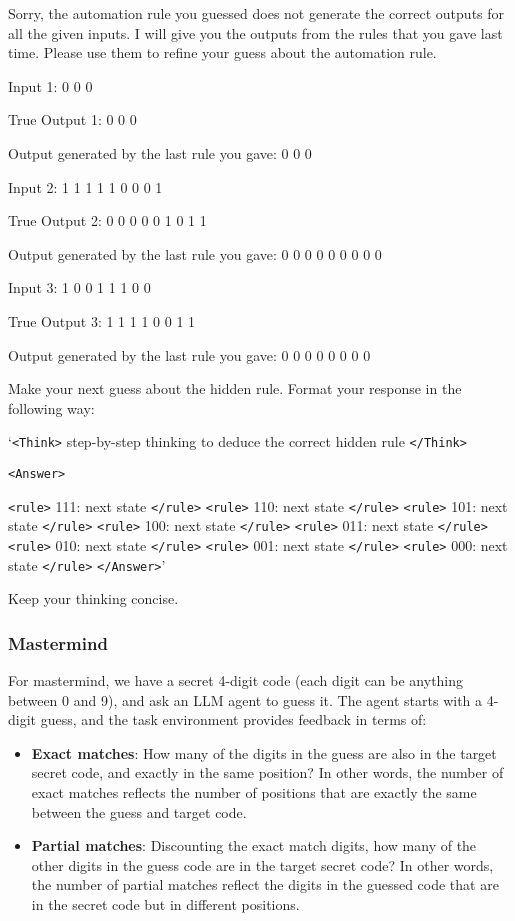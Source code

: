 \begin{tcolorbox}[colback=gray!20, colframe=black, title=Cellular Automata Environment Feedback]
Sorry, the automation rule you guessed does not generate the correct outputs for all the given inputs. I will give you the outputs from the rules that you gave last time. Please use them to refine your guess about the automation rule.

Input 1: 0 0 0

True Output 1: 0 0 0

Output generated by the last rule you gave: 0 0 0

Input 2: 1 1 1 1 1 0 0 0 1

True Output 2: 0 0 0 0 0 1 0 1 1

Output generated by the last rule you gave: 0 0 0 0 0 0 0 0 0

Input 3: 1 0 0 1 1 1 0 0

True Output 3: 1 1 1 1 0 0 1 1

Output generated by the last rule you gave: 0 0 0 0 0 0 0 0

Make your next guess about the hidden rule. Format your response in the following way: 

`\texttt{<Think>} step-by-step thinking to deduce the correct hidden rule \texttt{</Think>}

\texttt{<Answer>}

\texttt{<rule>} 111: next state \texttt{</rule>} \texttt{<rule>} 110: next state \texttt{</rule>} \texttt{<rule>} 101: next state \texttt{</rule>} \texttt{<rule>} 100: next state \texttt{</rule>} \texttt{<rule>} 011: next state \texttt{</rule>} \texttt{<rule>} 010: next state \texttt{</rule>} \texttt{<rule>} 001: next state \texttt{</rule>} \texttt{<rule>} 000: next state \texttt{</rule>}
\texttt{</Answer>}'

Keep your thinking concise.
\end{tcolorbox}

\newpage

\subsubsection{Mastermind}

For mastermind, we have a secret 4-digit code (each digit can be anything between 0 and 9), and ask an LLM agent to guess it. The agent starts with a 4-digit guess, and the task environment provides feedback in terms of:
\begin{itemize}
    \item \textbf{Exact matches}: How many of the digits in the guess are also in the target secret code, and exactly in the same position? In other words, the number of exact matches reflects the number of positions that are exactly the same between the guess and target code.
    \item \textbf{Partial matches}: Discounting the exact match digits, how many of the other digits in the guess code are in the target secret code? In other words, the number of partial matches reflect the digits in the guessed code that are in the secret code but in different positions.
\end{itemize}

